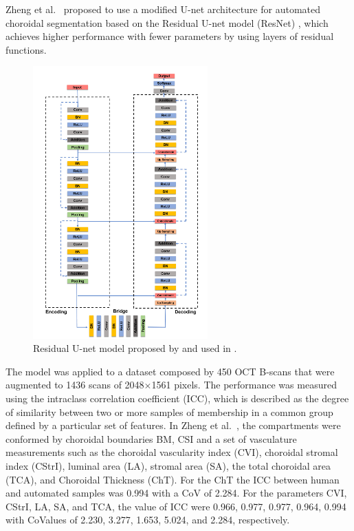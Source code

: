 \documentclass[12pt,a4paper]{scrartcl}
\begin{document}
Zheng et al.~\cite{Zheng2020} proposed to use a modified U-net architecture for automated choroidal segmentation based on the Residual U-net model (ResNet) \cite{He2015}, which achieves higher performance with fewer parameters by using layers of residual functions. 
\begin{figure}[H]
    \centering
    \includegraphics[width=0.6\textwidth]{./images/ResNet-architecture.png}
    \caption{Residual U-net model proposed by \cite{He2015} and used in \cite{Zheng2020}.}
\end{figure}

The model was applied to a dataset composed by 450 OCT B-scans that were augmented to 1436 scans of 2048$\times$1561 pixels. The performance was measured using the intraclass correlation coefficient (ICC), which is described as the degree of similarity between two or more samples of membership in a common group defined by a particular set of features. In Zheng et al.~\cite{Zheng2020}, the compartments were conformed by choroidal boundaries BM, CSI and a set of vasculature measurements such as the choroidal vascularity index (CVI), choroidal stromal index (CStrI), luminal area (LA), stromal area (SA), the total choroidal area (TCA), and Choroidal Thickness (ChT). For the ChT the ICC between human and automated samples was 0.994 with a CoV of 2.284. For the parameters CVI, CStrI, LA, SA, and TCA, the value of ICC were 0.966, 0.977, 0.977, 0.964, 0.994 with CoValues of 2.230, 3.277, 1.653, 5.024, and 2.284, respectively.
\end{document}
